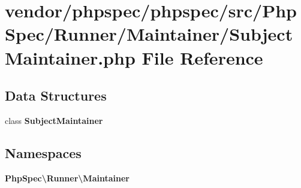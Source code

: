 \section{vendor/phpspec/phpspec/src/\+Php\+Spec/\+Runner/\+Maintainer/\+Subject\+Maintainer.php File Reference}
\label{_subject_maintainer_8php}
\subsection*{Data Structures}
\begin{DoxyCompactItemize}
\item 
class {\bf Subject\+Maintainer}
\end{DoxyCompactItemize}
\subsection*{Namespaces}
\begin{DoxyCompactItemize}
\item 
 {\bf Php\+Spec\textbackslash{}\+Runner\textbackslash{}\+Maintainer}
\end{DoxyCompactItemize}
